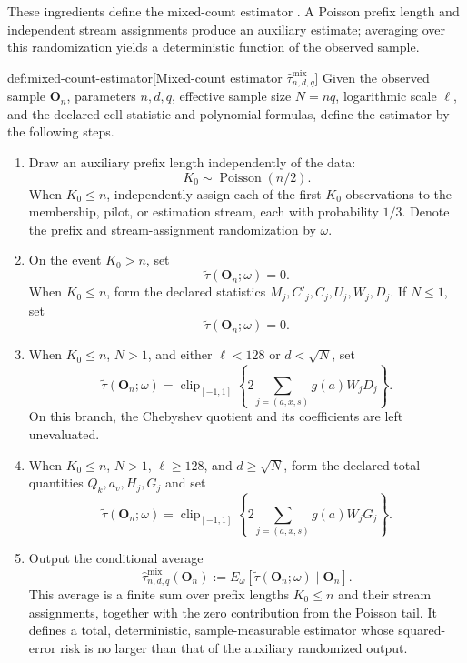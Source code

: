 \documentclass[11pt]{article}
\begin{document}
These ingredients define the mixed-count estimator . A Poisson prefix length  and independent stream assignments produce an auxiliary estimate; averaging over this randomization yields a deterministic function of the observed sample.

\begin{algorithmv}{def:mixed-count-estimator}[Mixed-count estimator $\widehat\tau^{\mathrm{mix}}_{n,d,q}$]
Given the observed sample \(\mathbf O_n\), parameters \(n,d,q\), effective sample size \(N=nq\), logarithmic scale \(\ell\), and the declared cell-statistic and polynomial formulas, define the estimator by the following steps.
\begin{enumerate}
\item Draw an auxiliary prefix length independently of the data:
\[
K_0\sim\operatorname{Poisson}(n/2).
\]
When \(K_0\le n\), independently assign each of the first \(K_0\) observations to the membership, pilot, or estimation stream, each with probability \(1/3\). Denote the prefix and stream-assignment randomization by \(\omega\).

\item On the event \(K_0>n\), set
\[
\widetilde\tau(\mathbf O_n;\omega)=0.
\]
When \(K_0\le n\), form the declared statistics \(M_j,C'_j,C_j,U_j,W_j,D_j\). If \(N\le1\), set
\[
\widetilde\tau(\mathbf O_n;\omega)=0.
\]

\item When \(K_0\le n\), \(N>1\), and either \(\ell<128\) or \(d<\sqrt N\), set
\[
\widetilde\tau(\mathbf O_n;\omega)
=
\operatorname{clip}_{[-1,1]}
\left\{
2\sum_{j=(a,x,s)}g(a)W_jD_j
\right\}.
\]
On this branch, the Chebyshev quotient and its coefficients are left unevaluated.

\item When \(K_0\le n\), \(N>1\), \(\ell\ge128\), and \(d\ge\sqrt N\), form the declared total quantities \(Q_k,a_v,H_j,G_j\) and set
\[
\widetilde\tau(\mathbf O_n;\omega)
=
\operatorname{clip}_{[-1,1]}
\left\{
2\sum_{j=(a,x,s)}g(a)W_jG_j
\right\}.
\]

\item Output the conditional average
\[
\widehat\tau^{\mathrm{mix}}_{n,d,q}(\mathbf O_n)
:=
E_\omega\!\left[
\widetilde\tau(\mathbf O_n;\omega)\mid\mathbf O_n
\right].
\]
This average is a finite sum over prefix lengths \(K_0\le n\) and their stream assignments, together with the zero contribution from the Poisson tail. It defines a total, deterministic, sample-measurable estimator whose squared-error risk is no larger than that of the auxiliary randomized output.
\end{enumerate}
\end{algorithmv}
\end{document}
